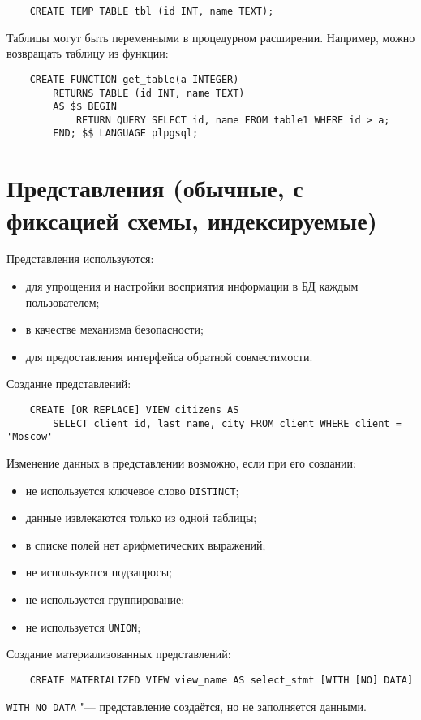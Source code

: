 \begin{verbatim}
	CREATE TEMP TABLE tbl (id INT, name TEXT);
\end{verbatim}

Таблицы могут быть переменными в процедурном расширении.
Например, можно возвращать таблицу из функции:
\begin{verbatim}
	CREATE FUNCTION get_table(a INTEGER)
		RETURNS TABLE (id INT, name TEXT)
		AS $$ BEGIN
			RETURN QUERY SELECT id, name FROM table1 WHERE id > a;
		END; $$ LANGUAGE plpgsql;
\end{verbatim}

\section{Представления (обычные, с фиксацией схемы, индексируемые)}

Представления используются:
\begin{itemize}
	\item для упрощения и настройки восприятия информации в БД каждым пользователем;
	\item в качестве механизма безопасности;
	\item для предоставления интерфейса обратной совместимости.
\end{itemize}

Создание представлений:
\begin{verbatim}
	CREATE [OR REPLACE] VIEW citizens AS
		SELECT client_id, last_name, city FROM client WHERE client = 'Moscow'
\end{verbatim}

Изменение данных в представлении возможно, если при его создании:
\begin{itemize}
	\item не используется ключевое слово \texttt{DISTINCT};
	\item данные извлекаются только из одной таблицы;
	\item в списке полей нет арифметических выражений;
	\item не используются подзапросы;
	\item не используется группирование;
	\item не используется \texttt{UNION};
\end{itemize}

Создание материализованных представлений:
\begin{verbatim}
	CREATE MATERIALIZED VIEW view_name AS select_stmt [WITH [NO] DATA]
\end{verbatim}
\texttt{WITH NO DATA} "--- представление создаётся, но не заполняется данными.

